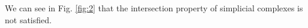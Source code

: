 \documentclass[../1.tex]{subfiles}
\begin{document}
    We can see in Fig. \ref{fig:2} that the intersection property of simplicial complexes is not satisfied.\\
    \hfill \\







\end{document}
